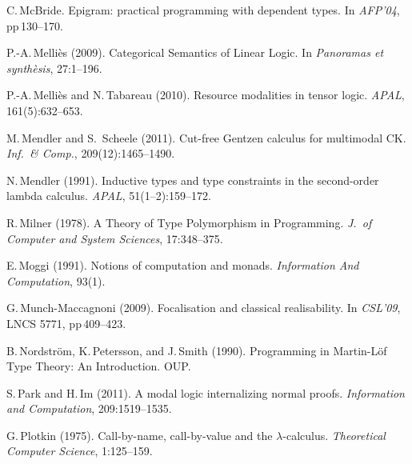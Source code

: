 \documentclass[11pt,twocolumn]{article}
\newcommand{\hide}[1]{}
\begin{document}
{\begin{thebibliography}{000}

C.\,McBride.
\newblock Epigram: practical programming with dependent types.
\newblock In \emph{AFP'04}, pp\,130--170.

P.-A.\,Melli\`es (2009).
\newblock Categorical Semantics of Linear Logic.
\newblock In \emph{Panoramas et synth\`esis}, 27:1--196.

P.-A.\,Melli\`es and N.\,Tabareau (2010).
\newblock Resource modalities in tensor logic.
\newblock \emph{APAL}, 161(5):632--653.

M.\,Mendler and S.\, Scheele (2011).
\newblock Cut-free Gentzen calculus for multimodal CK.
\newblock \emph{Inf.\ \& Comp.}, 209(12):1465--1490.

N.\,Mendler (1991). 
\newblock Inductive types and type constraints in the second-order lambda
calculus. 
\newblock \emph{APAL}, 51(1--2):159--172.

R.\,Milner (1978).
\newblock A Theory of Type Polymorphism in Programming.
\newblock \emph{J.\ of Computer and System Sciences}, 17:348--375.

E.\,Moggi (1991).
\newblock Notions of computation and monads. 
\newblock \emph{Information And Computation}, 93(1).

G.\,Munch-Maccagnoni (2009).
\newblock Focalisation and classical realisability.
\newblock In \emph{CSL'09}, LNCS 5771, pp\,409--423.

B.\,Nordstr\"om, K.\,Petersson, and J.\,Smith (1990).
\newblock Programming in Martin-L\"of Type Theory: An Introduction.
\newblock OUP.

S.\,Park and H.\,Im (2011).
\newblock A modal logic internalizing normal proofs.
\newblock \emph{Information and Computation}, 209:1519--1535.

\hide{
\bibitem{Pierce}
B.\,Pierce (2002).
\newblock \emph{Types and programming languages}.
}

G.\,Plotkin (1975).
\newblock Call-by-name, call-by-value and the \mbox{$\lambda$-calculus}.
\newblock \emph{Theoretical Computer Science}, 1:125--159.


\end{thebibliography}}
\end{document}
